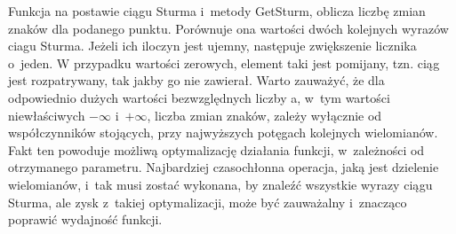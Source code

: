 Funkcja na postawie ciągu Sturma i~metody GetSturm, oblicza liczbę zmian znaków dla podanego punktu. Porównuje ona wartości dwóch kolejnych wyrazów ciagu Sturma. Jeżeli ich iloczyn jest ujemny, następuje zwiększenie licznika o~jeden. W przypadku wartości zerowych, element taki jest pomijany, tzn. ciąg jest rozpatrywany, tak jakby go nie zawierał. Warto zauważyć, że dla odpowiednio dużych wartości bezwzględnych liczby a, w~tym wartości niewłaściwych $-\infty$ i~$+\infty$, liczba zmian znaków, zależy wyłącznie od współczynników stojących, przy najwyższych potęgach kolejnych wielomianów. Fakt ten powoduje możliwą optymalizację działania funkcji, w~zależności od otrzymanego parametru. Najbardziej czasochłonna operacja, jaką jest dzielenie wielomianów, i~tak musi zostać wykonana, by znaleźć wszystkie wyrazy ciągu Sturma, ale zysk z~takiej optymalizacji, może być zauważalny i~znacząco poprawić wydajność funkcji.